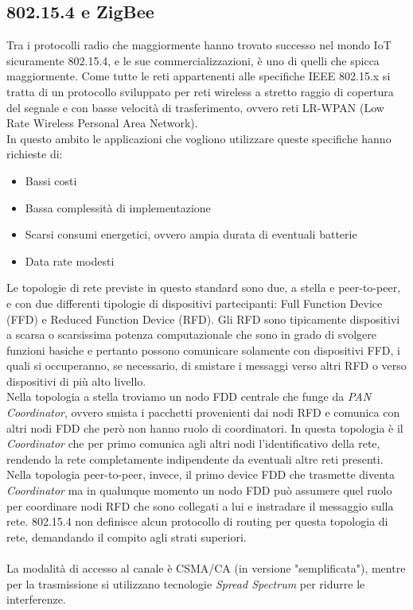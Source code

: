 \subsection{802.15.4 e ZigBee}
Tra i protocolli radio che maggiormente hanno trovato successo nel mondo IoT sicuramente 802.15.4, e le sue commercializzazioni, è uno di quelli che spicca maggiormente. Come tutte le reti appartenenti alle specifiche IEEE 802.15.x si tratta di un protocollo sviluppato per reti wireless a stretto raggio di copertura del segnale e con basse velocità di trasferimento, ovvero reti LR-WPAN (Low Rate Wireless Personal Area Network).
\\In questo ambito le applicazioni che vogliono utilizzare queste specifiche hanno richieste di:
\begin{itemize}
\item Bassi costi
\item Bassa complessità di implementazione
\item Scarsi consumi energetici, ovvero ampia durata di eventuali batterie
\item Data rate modesti
\end{itemize}
Le topologie di rete previste in questo standard sono due, a stella e peer-to-peer, e con due differenti tipologie di dispositivi partecipanti: Full Function Device (FFD) e Reduced Function Device (RFD). Gli RFD sono tipicamente dispositivi a scarsa o scarsissima potenza computazionale che sono in grado di svolgere funzioni basiche e pertanto possono comunicare solamente con dispositivi FFD, i quali si occuperanno, se necessario, di smistare i messaggi verso altri RFD o verso dispositivi di più alto livello.
\\Nella topologia a stella troviamo un nodo FDD centrale che funge da \textit{PAN Coordinator}, ovvero smista i pacchetti provenienti dai nodi RFD e comunica con altri nodi FDD che però non hanno ruolo di coordinatori. In questa topologia è il \textit{Coordinator} che per primo comunica agli altri nodi l'identificativo della rete, rendendo la rete completamente indipendente da eventuali altre reti presenti.
\\Nella topologia peer-to-peer, invece, il primo device FDD che trasmette diventa \textit{Coordinator} ma in qualunque momento un nodo FDD può assumere quel ruolo per coordinare nodi RFD che sono collegati a lui e instradare il messaggio sulla rete. 802.15.4 non definisce alcun protocollo di routing per questa topologia di rete, demandando il compito agli strati superiori.
\\\\La modalità di accesso al canale è CSMA/CA (in versione "semplificata"), mentre per la trasmissione si utilizzano tecnologie \textit{Spread Spectrum} per ridurre le interferenze.
